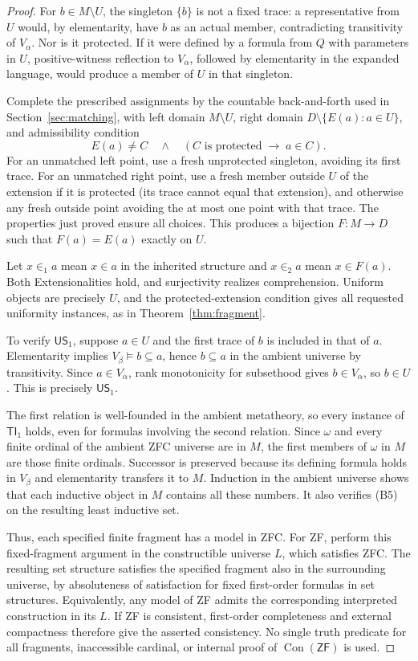 \documentclass[11pt,a4paper]{article}
\numberwithin{equation}{section}
\theoremstyle{definition}
\theoremstyle{remark}
\newcommand{\ZF}{\mathsf{ZF}}
\newcommand{\TI}{\mathsf{TI}_1}
\newcommand{\US}{\mathsf{US}_1}
\newcommand{\Con}{\operatorname{Con}}
\newcommand{\extone}{\in_1}
\newcommand{\exttwo}{\in_2}
\begin{document}
\begin{proof}
For $b\in M\setminus U$, the singleton $\{b\}$ is not a fixed trace: a representative from $U$ would, by elementarity, have $b$ as an actual member, contradicting transitivity of $V_\alpha$. Nor is it protected. If it were defined by a formula from $Q$ with parameters in $U$, positive-witness reflection to $V_\alpha$, followed by elementarity in the expanded language, would produce a member of $U$ in that singleton.

Complete the prescribed assignments by the countable back-and-forth used in Section~\ref{sec:matching}, with left domain $M\setminus U$, right domain $D\setminus\{E(a):a\in U\}$, and admissibility condition
\[E(a)\ne C\quad\land\quad(C\text{ is protected}\;\to\;a\in C).\]
For an unmatched left point, use a fresh unprotected singleton, avoiding its first trace. For an unmatched right point, use a fresh member outside $U$ of the extension if it is protected (its trace cannot equal that extension), and otherwise any fresh outside point avoiding the at most one point with that trace. The properties just proved ensure all choices. This produces a bijection $F:M\to D$ such that $F(a)=E(a)$ exactly on $U$.

Let $x\extone a$ mean $x\in a$ in the inherited structure and $x\exttwo a$ mean $x\in F(a)$. Both Extensionalities hold, and surjectivity realizes comprehension. Uniform objects are precisely $U$, and the protected-extension condition gives all requested uniformity instances, as in Theorem~\ref{thm:fragment}.

To verify $\US$, suppose $a\in U$ and the first trace of $b$ is included in that of $a$. Elementarity implies $V_\beta\models b\subseteq a$, hence $b\subseteq a$ in the ambient universe by transitivity. Since $a\in V_\alpha$, rank monotonicity for subsethood gives $b\in V_\alpha$, so $b\in U$. This is precisely $\US$.

The first relation is well-founded in the ambient metatheory, so every instance of $\TI$ holds, even for formulas involving the second relation. Since $\omega$ and every finite ordinal of the ambient ZFC universe are in $M$, the first members of $\omega$ in $M$ are those finite ordinals. Successor is preserved because its defining formula holds in $V_\beta$ and elementarity transfers it to $M$. Induction in the ambient universe shows that each inductive object in $M$ contains all these numbers. It also verifies (B5) on the resulting least inductive set.

Thus, each specified finite fragment has a model in ZFC. For ZF, perform this fixed-fragment argument in the constructible universe $L$, which satisfies ZFC. The resulting set structure satisfies the specified fragment also in the surrounding universe, by absoluteness of satisfaction for fixed first-order formulas in set structures. Equivalently, any model of ZF admits the corresponding interpreted construction in its $L$. If ZF is consistent, first-order completeness and external compactness therefore give the asserted consistency. No single truth predicate for all fragments, inaccessible cardinal, or internal proof of $\Con(\ZF)$ is used.
\end{proof}
\end{document}
